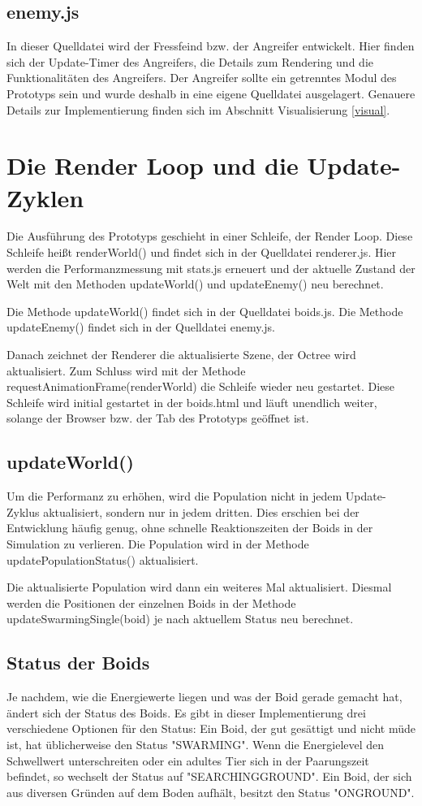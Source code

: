 \documentclass[draft=false
              ,paper=a4
              ,twoside=false
              ,fontsize=11pt
              ,headsepline
              ,BCOR10mm
              ,DIV11
              ,bibtotoc
              ,liststotoc
              ]{scrbook}
\begin{document}
\subsection{enemy.js}
In dieser Quelldatei wird der Fressfeind bzw. der Angreifer entwickelt. Hier finden sich der Update-Timer des Angreifers, die Details zum Rendering und die Funktionalitäten des Angreifers. Der Angreifer sollte ein getrenntes Modul des Prototyps sein und wurde deshalb in eine eigene Quelldatei ausgelagert. Genauere Details zur Implementierung finden sich im Abschnitt Visualisierung \ref{visual}.

\section{Die Render Loop und die Update-Zyklen}
Die Ausführung des Prototyps geschieht in einer Schleife, der Render Loop. Diese Schleife heißt renderWorld() und findet sich in der Quelldatei renderer.js. Hier werden die Performanzmessung mit stats.js erneuert und der aktuelle Zustand der Welt mit den Methoden updateWorld() und updateEnemy() neu berechnet.

Die Methode updateWorld() findet sich in der Quelldatei boids.js. Die Methode updateEnemy() findet sich in der Quelldatei enemy.js.

Danach zeichnet der Renderer die aktualisierte Szene, der Octree wird aktualisiert. Zum Schluss wird mit der Methode requestAnimationFrame(renderWorld) die Schleife wieder neu gestartet. Diese Schleife wird initial gestartet in der boids.html und läuft unendlich weiter, solange der Browser bzw. der Tab des Prototyps geöffnet ist.

\subsection{updateWorld()}
Um die Performanz zu erhöhen, wird die Population nicht in jedem Update-Zyklus aktualisiert, sondern nur in jedem dritten. Dies erschien bei der Entwicklung häufig genug, ohne schnelle Reaktionszeiten der Boids in der Simulation zu verlieren. Die Population wird in der Methode updatePopulationStatus() aktualisiert.

Die aktualisierte Population wird dann ein weiteres Mal aktualisiert. Diesmal werden die Positionen der einzelnen Boids in der Methode updateSwarmingSingle(boid) je nach aktuellem Status neu berechnet.

\subsection{Status der Boids}
Je nachdem, wie die Energiewerte liegen und was der Boid gerade gemacht hat, ändert sich der Status des Boids. Es gibt in dieser Implementierung drei verschiedene Optionen für den Status:
Ein Boid, der gut gesättigt und nicht müde ist, hat üblicherweise den Status "{}SWARMING"{}. Wenn die Energielevel den Schwellwert unterschreiten oder ein adultes Tier sich in der Paarungszeit befindet, so wechselt der Status auf "{}SEARCHINGGROUND"{}. Ein Boid, der sich aus diversen Gründen auf dem Boden aufhält, besitzt den Status "{}ONGROUND"{}.
\end{document}
